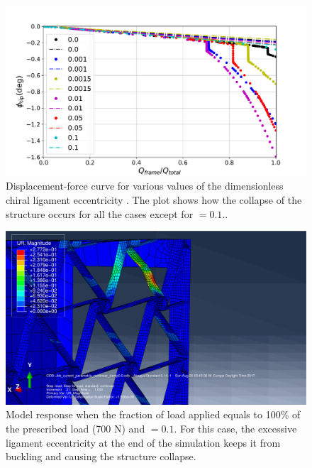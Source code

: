       \begin{figure}[!htpb] %
        \centering
        \includegraphics[width=0.8 \textwidth]{../figures/result-sim/eccen/force_displacement-far}
        \caption[Displacement-force curve for various values of the dimensionless chiral ligament eccentricity]{Displacement-force curve for various values of the dimensionless chiral ligament eccentricity \chie. The plot shows how the collapse of the structure occurs for all the cases except for \chie$= 0.1$..}\label{fig:forceDisplacement-far-e}
      \end{figure}

      \begin{figure}[!htpb] %
        \centering
        \includegraphics[width=0.8 \textwidth]{../figures/result-sim/eccen/0coma1-700N}
        \caption[Model response when the fraction of load applied equals to 100\% of the prescribed load (700 N) and \chie$= 0.1$]{Model response when the fraction of load applied equals to 100\% of the prescribed load (700 N) and \chie$= 0.1$. For this case, the excessive ligament eccentricity at the end of the simulation keeps it from buckling and causing the structure collapse.}
        \label{fig:e0coma1-UR}
      \end{figure}

